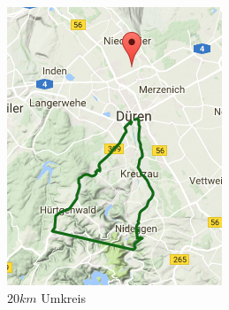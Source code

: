 \documentclass[a4paper,11pt,utf8]{scrartcl}
\begin{document}
\begin{figure}[htb]
    \centering
    \begin{minipage}[t]{0.45\linewidth}
        \centering
        \includegraphics[width=\linewidth]{pics/abgehackt.PNG}
        \caption{$20km$ Umkreis}\label{fig1}
    \end{minipage}%
    \hfill
    \begin{minipage}[t]{0.45\linewidth}
        \centering

\end{minipage}
\end{figure}
\end{document}
